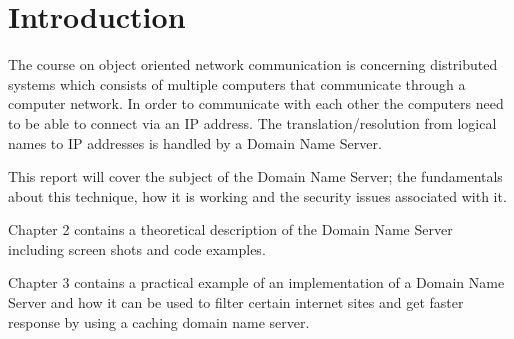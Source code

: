 \documentclass[Preamble]{subfiles}
\begin{document}
\chapter{Introduction}
The course on object oriented network communication is concerning distributed systems which consists of multiple computers that communicate through a computer network. In order to communicate with each other the computers need to be able to connect via an IP address. The translation/resolution from logical names to IP addresses is handled by a Domain Name Server.\vspace{10pt}

This report will cover the subject of the Domain Name Server; the fundamentals about this technique, how it is working and the security issues associated with it.\vspace{10pt}

Chapter 2 contains a theoretical description of the Domain Name Server including screen shots and code examples.\vspace{10pt}

Chapter 3 contains a practical example of an implementation of a Domain Name Server and how it can be used to filter certain internet sites and get faster response by using a caching domain name server.
\end{document}
